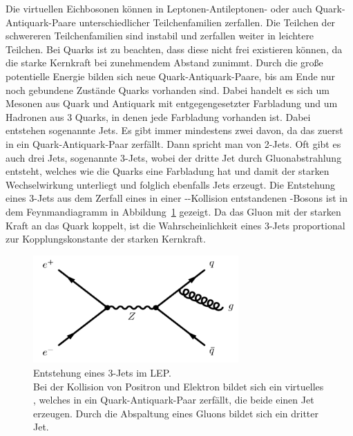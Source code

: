 \documentclass[a4paper,ngerman]{scrartcl}
\begin{document}
Die virtuellen Eichbosonen können in Leptonen-Antileptonen- oder auch 
Quark-Antiquark-Paare unterschiedlicher Teilchenfamilien zerfallen. 
Die Teilchen der schwereren Teilchenfamilien sind instabil und zerfallen weiter in leichtere Teilchen.
Bei Quarks ist zu beachten, dass diese nicht frei existieren können,
da die starke Kernkraft bei zunehmendem Abstand zunimmt.
Durch die große potentielle Energie bilden sich neue Quark-Antiquark-Paare,
bis am Ende nur noch gebundene Zustände Quarks vorhanden sind. 
Dabei handelt es sich um 
Mesonen aus Quark und Antiquark mit entgegengesetzter Farbladung und um Hadronen aus 3 Quarks,
in denen jede Farbladung vorhanden ist. 
Dabei entstehen sogenannte Jets. 
Es gibt immer mindestens zwei davon, da das \PZzero zuerst in ein Quark-Antiquark-Paar zerfällt. 
Dann spricht man von 2-Jets.
Oft gibt es auch drei Jets, sogenannte 3-Jets, wobei der dritte Jet durch Gluonabstrahlung entsteht,
welches wie die Quarks eine Farbladung hat und damit der starken Wechselwirkung unterliegt und folglich ebenfalls Jets erzeugt.
Die Entstehung eines 3-Jets aus dem Zerfall eines in einer \Pelectron-\APelectron-Kollision entstandenen \PZzero-Bosons ist 
in dem Feynmandiagramm in Abbildung~\ref{fig:3jet} gezeigt.
Da das Gluon mit der starken Kraft an das Quark koppelt, ist die
Wahrscheinlichkeit eines 3-Jets proportional zur
Kopplungskonstante der starken Kernkraft.\\
\begin{figure}[tbh!]
  \centering
  \includegraphics[width=0.7\textwidth]{abbildungen/3jet_feyn.png}
  \caption{Entstehung eines 3-Jets im LEP.\\ Bei der Kollision von Positron und Elektron bildet sich ein virtuelles \PZzero, welches in ein Quark-Antiquark-Paar zerfällt, die beide einen Jet erzeugen. Durch die Abspaltung eines Gluons bildet sich ein dritter Jet.}
  \label{fig:3jet}
\end{figure}
\end{document}
